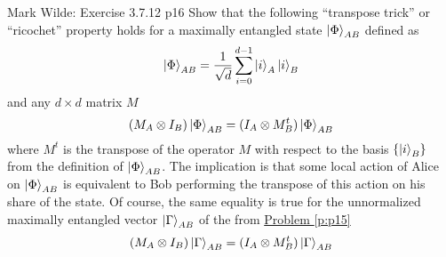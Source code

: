 \documentclass[a4paper, 11pt]{article}
\begin{document}
\begin{problem}{%
		Mark Wilde: Exercise 3.7.12
	}{p16%
	}
	Show that the following ``transpose trick” or ``ricochet” property holds for a maximally entangled state $\ket{\Phi}_{AB}$ defined as $$\ket{\Phi}_{AB}=\frac1{\sqrt{d}}\sum_{i=0}^{d-1}\ket{i}_A\ket{i}_B$$ and any $d \times d$ matrix $M$ $$(M_A\otimes I_B)\ket{\Phi}_{AB}=(I_A\otimes M_B^t)\ket{\Phi}_{AB}$$where $M^t$ is the transpose of the operator $M$ with respect to the basis $\{\ket{i}_B\}$ from  the definition of $\ket{\Phi}_{AB}$. The implication is that some local action of Alice on $\ket{\Phi}_{AB}$ is equivalent to Bob performing the transpose of this action on his share of the state.
	Of course, the same equality is true for the unnormalized maximally entangled
	vector  $\ket{\Gamma}_{AB}$ of the from \hyperref[p:p15]{Problem \ref{p:p15}}$$(M_A\otimes I_B)\ket{\Gamma}_{AB}=(I_A\otimes M_B^t)\ket{\Gamma}_{AB}$$
\end{problem}

\end{document}
